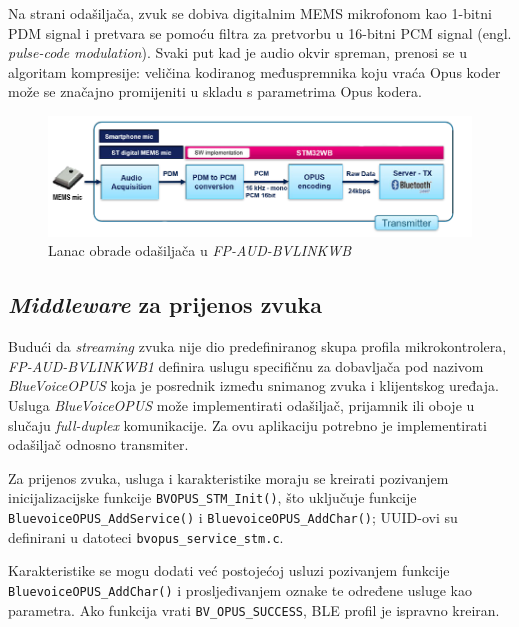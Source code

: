 Na strani odašiljača, zvuk se dobiva digitalnim MEMS mikrofonom kao 1-bitni PDM signal i pretvara se pomoću filtra za pretvorbu u 16-bitni PCM signal (engl. \textit{pulse-code modulation}). Svaki put kad je audio okvir spreman, prenosi se u algoritam kompresije: veličina kodiranog međuspremnika koju vraća Opus koder može se značajno promijeniti u skladu s parametrima Opus kodera.

\begin{figure}[ht]
	\includegraphics[width=\linewidth]{imgs/duplex_chain}
	\caption{Lanac obrade odašiljača u \textit{FP-AUD-BVLINKWB} \cite{fpaudbvlink}}
	\label{fig:duplex_chain}
\end{figure}

\subsection{\textit{Middleware} za prijenos zvuka}

Budući da \textit{streaming} zvuka nije dio predefiniranog skupa profila mikrokontrolera, \textit{FP-AUD-BVLINKWB1} definira uslugu specifičnu za dobavljača pod nazivom \textit{BlueVoiceOPUS} koja je posrednik između snimanog zvuka i  klijentskog uređaja. 
Usluga \textit{BlueVoiceOPUS} može implementirati odašiljač, prijamnik ili oboje u slučaju \textit{full-duplex} komunikacije. Za ovu aplikaciju potrebno je implementirati odašiljač odnosno transmiter.

Za prijenos zvuka, usluga i karakteristike moraju se kreirati pozivanjem inicijalizacijske funkcije \lstinline|BVOPUS_STM_Init()|, što uključuje funkcije \newline \lstinline|BluevoiceOPUS_AddService()| i \lstinline|BluevoiceOPUS_AddChar()|; UUID-ovi su definirani u datoteci \lstinline|bvopus_service_stm.c|.

Karakteristike se mogu dodati već postojećoj usluzi pozivanjem funkcije \newline \lstinline|BluevoiceOPUS_AddChar()| i prosljeđivanjem oznake te određene usluge kao parametra. Ako funkcija vrati \lstinline|BV_OPUS_SUCCESS|, BLE profil je ispravno kreiran.

